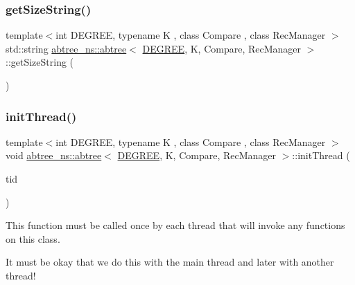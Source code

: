 \subsubsection{\texorpdfstring{get\+Size\+String()}{getSizeString()}\hspace{0.1cm}{\footnotesize\ttfamily [2/2]}}
{\footnotesize\ttfamily template$<$int D\+E\+G\+R\+EE, typename K , class Compare , class Rec\+Manager $>$ \\
std\+::string \hyperlink{classabtree__ns_1_1abtree}{abtree\+\_\+ns\+::abtree}$<$ \hyperlink{brown__sigouin__abtree__kcas_2adapter_8h_a5d88b17d70c985f2f2b8e987037fd6dd}{D\+E\+G\+R\+EE}, K, Compare, Rec\+Manager $>$\+::get\+Size\+String (\begin{DoxyParamCaption}{ }\end{DoxyParamCaption})\hspace{0.3cm}{\ttfamily [inline]}}

\mbox{\label{classabtree__ns_1_1abtree_a04d2955852cc93867ec9ffcd40d27883}} 
\subsubsection{\texorpdfstring{init\+Thread()}{initThread()}\hspace{0.1cm}{\footnotesize\ttfamily [1/2]}}
{\footnotesize\ttfamily template$<$int D\+E\+G\+R\+EE, typename K , class Compare , class Rec\+Manager $>$ \\
void \hyperlink{classabtree__ns_1_1abtree}{abtree\+\_\+ns\+::abtree}$<$ \hyperlink{brown__sigouin__abtree__kcas_2adapter_8h_a5d88b17d70c985f2f2b8e987037fd6dd}{D\+E\+G\+R\+EE}, K, Compare, Rec\+Manager $>$\+::init\+Thread (\begin{DoxyParamCaption}\item[{const int}]{tid }\end{DoxyParamCaption})\hspace{0.3cm}{\ttfamily [inline]}}

This function must be called once by each thread that will invoke any functions on this class.

It must be okay that we do this with the main thread and later with another thread! \mbox{\label{classabtree__ns_1_1abtree_a04d2955852cc93867ec9ffcd40d27883}} 
